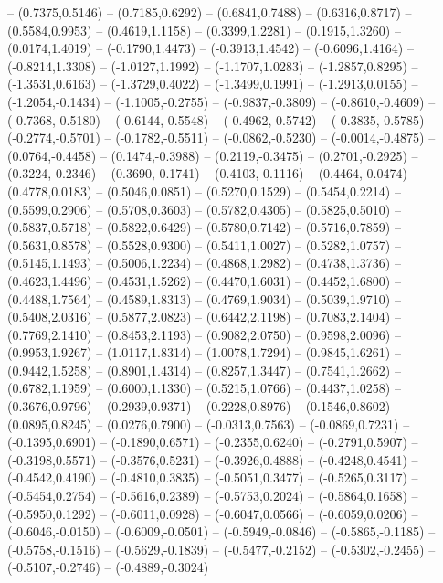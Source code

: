 {	-- (0.7375,0.5146)
	-- (0.7185,0.6292)
	-- (0.6841,0.7488)
	-- (0.6316,0.8717)
	-- (0.5584,0.9953)
	-- (0.4619,1.1158)
	-- (0.3399,1.2281)
	-- (0.1915,1.3260)
	-- (0.0174,1.4019)
	-- (-0.1790,1.4473)
	-- (-0.3913,1.4542)
	-- (-0.6096,1.4164)
	-- (-0.8214,1.3308)
	-- (-1.0127,1.1992)
	-- (-1.1707,1.0283)
	-- (-1.2857,0.8295)
	-- (-1.3531,0.6163)
	-- (-1.3729,0.4022)
	-- (-1.3499,0.1991)
	-- (-1.2913,0.0155)
	-- (-1.2054,-0.1434)
	-- (-1.1005,-0.2755)
	-- (-0.9837,-0.3809)
	-- (-0.8610,-0.4609)
	-- (-0.7368,-0.5180)
	-- (-0.6144,-0.5548)
	-- (-0.4962,-0.5742)
	-- (-0.3835,-0.5785)
	-- (-0.2774,-0.5701)
	-- (-0.1782,-0.5511)
	-- (-0.0862,-0.5230)
	-- (-0.0014,-0.4875)
	-- (0.0764,-0.4458)
	-- (0.1474,-0.3988)
	-- (0.2119,-0.3475)
	-- (0.2701,-0.2925)
	-- (0.3224,-0.2346)
	-- (0.3690,-0.1741)
	-- (0.4103,-0.1116)
	-- (0.4464,-0.0474)
	-- (0.4778,0.0183)
	-- (0.5046,0.0851)
	-- (0.5270,0.1529)
	-- (0.5454,0.2214)
	-- (0.5599,0.2906)
	-- (0.5708,0.3603)
	-- (0.5782,0.4305)
	-- (0.5825,0.5010)
	-- (0.5837,0.5718)
	-- (0.5822,0.6429)
	-- (0.5780,0.7142)
	-- (0.5716,0.7859)
	-- (0.5631,0.8578)
	-- (0.5528,0.9300)
	-- (0.5411,1.0027)
	-- (0.5282,1.0757)
	-- (0.5145,1.1493)
	-- (0.5006,1.2234)
	-- (0.4868,1.2982)
	-- (0.4738,1.3736)
	-- (0.4623,1.4496)
	-- (0.4531,1.5262)
	-- (0.4470,1.6031)
	-- (0.4452,1.6800)
	-- (0.4488,1.7564)
	-- (0.4589,1.8313)
	-- (0.4769,1.9034)
	-- (0.5039,1.9710)
	-- (0.5408,2.0316)
	-- (0.5877,2.0823)
	-- (0.6442,2.1198)
	-- (0.7083,2.1404)
	-- (0.7769,2.1410)
	-- (0.8453,2.1193)
	-- (0.9082,2.0750)
	-- (0.9598,2.0096)
	-- (0.9953,1.9267)
	-- (1.0117,1.8314)
	-- (1.0078,1.7294)
	-- (0.9845,1.6261)
	-- (0.9442,1.5258)
	-- (0.8901,1.4314)
	-- (0.8257,1.3447)
	-- (0.7541,1.2662)
	-- (0.6782,1.1959)
	-- (0.6000,1.1330)
	-- (0.5215,1.0766)
	-- (0.4437,1.0258)
	-- (0.3676,0.9796)
	-- (0.2939,0.9371)
	-- (0.2228,0.8976)
	-- (0.1546,0.8602)
	-- (0.0895,0.8245)
	-- (0.0276,0.7900)
	-- (-0.0313,0.7563)
	-- (-0.0869,0.7231)
	-- (-0.1395,0.6901)
	-- (-0.1890,0.6571)
	-- (-0.2355,0.6240)
	-- (-0.2791,0.5907)
	-- (-0.3198,0.5571)
	-- (-0.3576,0.5231)
	-- (-0.3926,0.4888)
	-- (-0.4248,0.4541)
	-- (-0.4542,0.4190)
	-- (-0.4810,0.3835)
	-- (-0.5051,0.3477)
	-- (-0.5265,0.3117)
	-- (-0.5454,0.2754)
	-- (-0.5616,0.2389)
	-- (-0.5753,0.2024)
	-- (-0.5864,0.1658)
	-- (-0.5950,0.1292)
	-- (-0.6011,0.0928)
	-- (-0.6047,0.0566)
	-- (-0.6059,0.0206)
	-- (-0.6046,-0.0150)
	-- (-0.6009,-0.0501)
	-- (-0.5949,-0.0846)
	-- (-0.5865,-0.1185)
	-- (-0.5758,-0.1516)
	-- (-0.5629,-0.1839)
	-- (-0.5477,-0.2152)
	-- (-0.5302,-0.2455)
	-- (-0.5107,-0.2746)
	-- (-0.4889,-0.3024)
}
